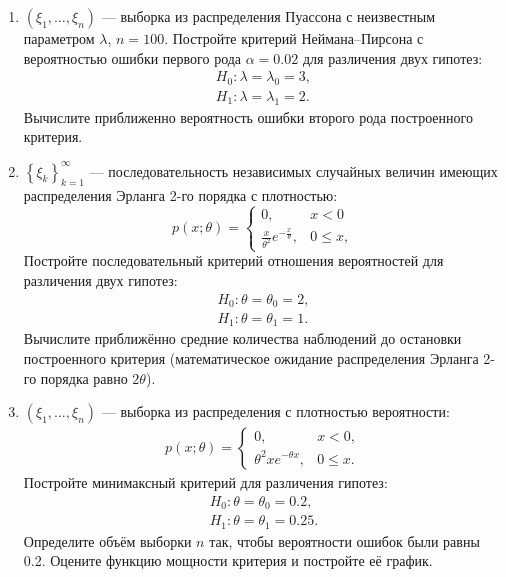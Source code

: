 \documentclass[a4paper,12pt]{article}
\newcommand{\sample}[2]{\left( #1_1, \dots, #1_{#2} \right)}
\begin{document}
    \begin{enumerate}[topsep=1cm, parsep=1cm, resume]
        \item $\left( \xi_1, \dots, \xi_n \right)$ --- выборка из распределения Пуассона с неизвестным параметром $\lambda$, $n=100$.
              Постройте критерий Неймана--Пирсона с вероятностью ошибки первого рода $\alpha = 0.02$ для различения двух гипотез:
              \begin{gather*}
                  H_0: \lambda = \lambda_0 = 3 , \\
                  H_1: \lambda = \lambda_1 = 2.
              \end{gather*}
              Вычислите приближенно вероятность ошибки второго рода построенного критерия.

        \item $\left\{ \xi_k \right\}_{k=1}^\infty$ --- последовательность независимых случайных величин имеющих распределения Эрланга 2-го порядка с плотностью:
              \[
                  p(x; \theta)
                  = \left \{
                  \begin{array}{ll}
                      0,                                        & x < 0    \\
                      \frac{x}{\theta^2} e^{-\frac{x}{\theta}}, & 0 \le x,
                  \end{array}
                  \right .
              \]
              Постройте последовательный критерий отношения вероятностей для различения двух гипотез:
              \begin{gather*}
                  H_0: \theta = \theta_0 = 2 , \\
                  H_1: \theta = \theta_1 = 1.
              \end{gather*}
              Вычислите приближённо средние количества наблюдений до остановки построенного критерия (математическое ожидание распределения Эрланга 2-го
              порядка равно $2 \theta$).

        \item $\sample{\xi}{n}$ --- выборка из распределения с плотностью вероятности:
              \begin{gather*}
                  p(x; \theta) =
                  \left \{
                  \begin{array}{ll}
                      0,                        & x < 0,    \\
                      \theta^2 x e^{-\theta x}, & 0 \le x .
                  \end{array}
                  \right .
              \end{gather*}
              Постройте минимаксный критерий для различения гипотез:
              \begin{gather*}
                  H_0: \theta = \theta_0 = 0.2 , \\
                  H_1: \theta = \theta_1 = 0.25.
              \end{gather*}
              Определите объём выборки $n$ так, чтобы вероятности ошибок были равны 0.2. Оцените функцию мощности критерия и постройте её график.
    \end{enumerate}
\end{document}
